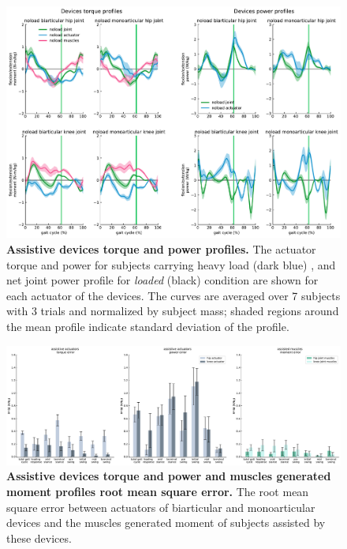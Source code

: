 \documentclass[10pt,letterpaper]{article}
\begin{document}
\begin{figure}[ht]   
	\centering
	\includegraphics[width=\linewidth]{Case_Studies/NoloadMono06_NoloadBi12/PaperFigure_Profiles.pdf}
	\vspace{1mm}
	\caption{{\small\textbf{Assistive devices torque and power profiles.} The actuator torque and power for subjects carrying heavy load (dark blue) , and net joint power profile for \textit{loaded} (black) condition are shown for each actuator of the devices. The curves are averaged over 7 subjects with 3 trials and normalized by subject mass; shaded regions around the mean profile indicate standard deviation of the profile.}}
	\label{Fig_Case02_Torque_Power_Profiles}
\end{figure}
\begin{figure}[ht]   
	\centering
	\includegraphics[width=\linewidth]{Case_Studies/NoloadMono06_NoloadBi12/RMSE.pdf}
	\vspace{1mm}
	\caption{\small{\textbf{Assistive devices torque and power and muscles generated moment profiles root mean square error. } The root mean square error between actuators of biarticular and monoarticular devices and the muscles generated moment of subjects assisted by these devices.}}
	\label{Fig_Case02_RMSE}
\end{figure} 
\end{document}

